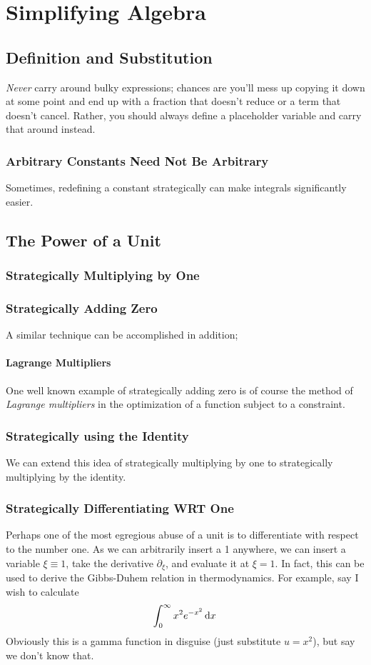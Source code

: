 \chapter{Simplifying Algebra}
\section{Definition and Substitution}
\emph{Never} carry around bulky expressions; chances are you'll mess up copying it down at some point and end up with a fraction that doesn't reduce or a term that doesn't cancel. Rather, you should always define a placeholder variable and carry that around instead.
\subsection{Arbitrary Constants Need Not Be Arbitrary}
Sometimes, redefining a constant strategically can make integrals significantly easier.


\section{The Power of a Unit}
\subsection{Strategically Multiplying by One}
\subsection{Strategically Adding Zero}
A similar technique can be accomplished in addition;

\subsubsection{Lagrange Multipliers}
One well known example of strategically adding zero is of course the method of \emph{Lagrange multipliers} in the optimization  of a function subject to a constraint.

\subsection{Strategically using the Identity}
We can extend this idea of strategically multiplying by one to strategically multiplying by the identity.

\subsection{Strategically Differentiating WRT One}
Perhaps one of the most egregious abuse of a unit is to differentiate with respect to the number one. As we can arbitrarily insert a 1 anywhere, we can insert a variable \(\xi \equiv 1\), take the derivative \(\partial_\xi\), and evaluate it at \(\xi = 1\). In fact, this can be used to derive the Gibbs-Duhem relation in thermodynamics. For example, say I wish to calculate
\[\int_0^\infty x^2e^{-x^2}\d{x}\]
Obviously this is a gamma function in disguise (just substitute \(u=x^2\)), but say we don't know that.

